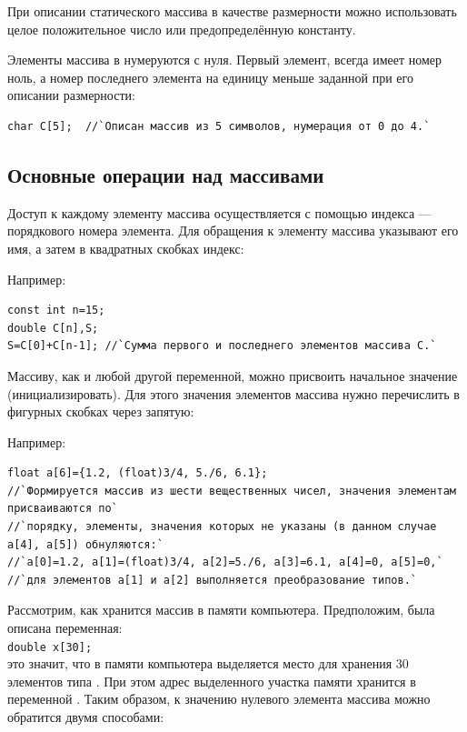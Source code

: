 При описании статического массива в качестве размерности можно использовать целое положительное число или
предопределённую константу.

Элементы массива в  нумеруются с нуля. Первый элемент, всегда имеет номер ноль, а номер последнего элемента на
единицу меньше заданной при его описании размерности: 
\begin{lstlisting}
char C[5];  //`Описан массив из 5 символов, нумерация от 0 до 4.`
\end{lstlisting}

\subsection[Основные операции над массивами]{Основные операции над массивами}
Доступ к каждому элементу массива осуществляется с помощью индекса --- порядкового номера элемента. Для обращения к
элементу массива указывают его имя, а затем в квадратных скобках индекс:


Например:
\begin{lstlisting}
const int n=15; 
double C[n],S;
S=C[0]+C[n-1]; //`Сумма первого и последнего элементов массива С.`
\end{lstlisting}

Массиву, как и любой другой переменной, можно присвоить начальное значение (инициализировать). Для этого значения
элементов массива нужно перечислить в фигурных скобках через запятую:

{\small{}}

Например:
\begin{lstlisting}
float a[6]={1.2, (float)3/4, 5./6, 6.1}; 
//`Формируется массив из шести вещественных чисел, значения элементам присваиваются по`
//`порядку, элементы, значения которых не указаны (в данном случае a[4], a[5]) обнуляются:`
//`a[0]=1.2, a[1]=(float)3/4, a[2]=5./6, a[3]=6.1, a[4]=0, a[5]=0,` 
//`для элементов a[1] и a[2] выполняется преобразование типов.`
\end{lstlisting}

Рассмотрим, как хранится массив в памяти компьютера. Предположим, была описана переменная:\\
\lstinline!double x[30];! \\
это значит, что в памяти компьютера выделяется место для хранения 30 элементов типа . При этом адрес
выделенного участка памяти хранится в переменной . Таким образом, к значению нулевого элемента массива 
можно обратится двумя способами:

